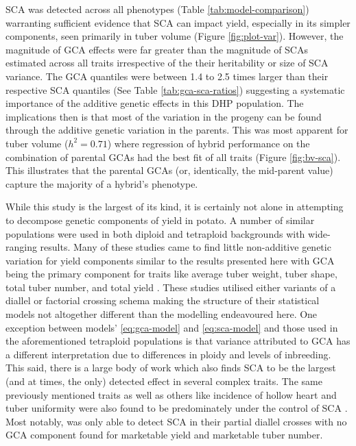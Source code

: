 \begin{refsection}
SCA was detected across all phenotypes (Table \ref{tab:model-comparison}) warranting sufficient evidence that SCA can impact yield, especially in its simpler components, seen primarily in tuber volume (Figure \ref{fig:plot-var}). However, the magnitude of GCA effects were far greater than the magnitude of SCAs estimated across all traits irrespective of the their heritability or size of SCA variance. The GCA quantiles were between 1.4 to 2.5 times larger than their respective SCA quantiles (See Table \ref{tab:gca-sca-ratios}) suggesting a systematic importance of the additive genetic effects in this DHP population. The implications then is that most of the variation in the progeny can be found through the additive genetic variation in the parents. This was most apparent for tuber volume (\(h^2 = 0.71\)) where regression of hybrid performance on the combination of parental GCAs had the best fit of all traits (Figure \ref{fig:bv-sca}). This illustrates that the parental GCAs (or, identically, the mid-parent value) capture the majority of a hybrid's phenotype.

While this study is the largest of its kind, it is certainly not alone in attempting to decompose genetic components of yield in potato. A number of similar populations were used in both diploid and tetraploid backgrounds with wide-ranging results. Many of these studies came to find little non-additive genetic variation for yield components similar to the results presented here with GCA being the primary component for traits like average tuber weight, tuber shape, total tuber number, and total yield \parencite{Veilleux1981, Brown1989, Neele1991}. These studies utilised either variants of a diallel or factorial crossing schema making the structure of their statistical models not altogether different than the modelling endeavoured here. One exception between models' \eqref{eq:gca-model} and \eqref{eq:sca-model} and those used in the aforementioned tetraploid populations is that variance attributed to GCA has a different interpretation due to differences in ploidy and levels of inbreeding. This said, there is a large body of work which also finds SCA to be the largest (and at times, the only) detected effect in several complex traits. The same previously mentioned traits as well as others like incidence of hollow heart and tuber uniformity were also found to be predominately under the control of SCA \parencite{Killick1977, Veilleux1981, Thompson1984, Haynes2001}. Most notably, \parencite{Tai1976} was only able to detect SCA in their partial diallel crosses with no GCA component found for marketable yield and marketable tuber number.


\end{refsection}
